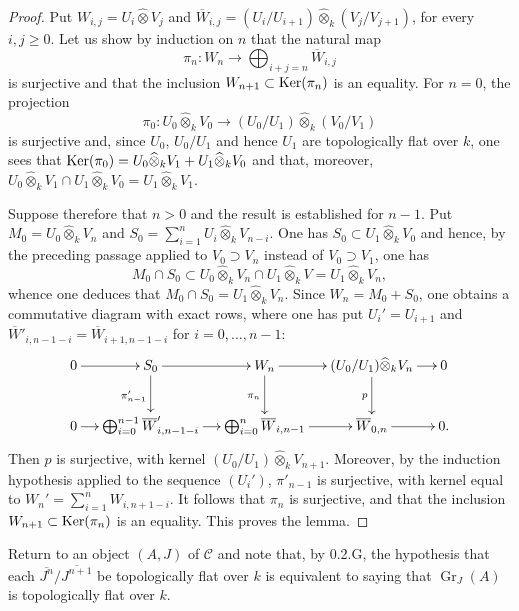 \begin{proof}
Put $W_{i,j}=U_i\widehat\otimes V_j$ and $\overline W_{i,j}=(U_i/U_{i+1})\widehat\otimes_k(V_j/V_{j+1})$, for every $i,j\ge0$. Let us show by induction on $n$ that the natural map
\[
\pi_n:W_n\longrightarrow\bigoplus_{i+j=n}\overline W_{i,j}
\]
is surjective and that the inclusion $W_{n+1}\subset\operatorname{Ker}(\pi_n)$ is an equality. For $n=0$, the projection
\[
\pi_0:U_0\widehat\otimes_k V_0\longrightarrow(U_0/U_1)\widehat\otimes_k(V_0/V_1)
\]
is surjective and, since $U_0$, $U_0/U_1$ and hence $U_1$ are topologically flat over $k$, one sees that $\operatorname{Ker}(\pi_0)=U_0\widehat\otimes_k V_1+U_1\widehat\otimes_k V_0$ and that, moreover, $U_0\widehat\otimes_k V_1\cap U_1\widehat\otimes_k V_0=U_1\widehat\otimes_k V_1$.

Suppose therefore that $n>0$ and the result is established for $n-1$. Put $M_0=U_0\widehat\otimes_k V_n$ and $S_0=\sum_{i=1}^n U_i\widehat\otimes_k V_{n-i}$. One has $S_0\subset U_1\widehat\otimes_k V_0$ and hence, by the preceding passage applied to $V_0\supset V_n$ instead of $V_0\supset V_1$, one has
\[
M_0\cap S_0\subset U_0\widehat\otimes_k V_n\cap U_1\widehat\otimes_k V=U_1\widehat\otimes_k V_n,
\]
whence one deduces that $M_0\cap S_0=U_1\widehat\otimes_k V_n$. Since $W_n=M_0+S_0$, one obtains a commutative diagram with exact rows, where one has put $U_i'=U_{i+1}$ and $\overline W'_{i,n-1-i}=\overline W_{i+1,n-1-i}$ for $i=0,\ldots,n-1$:
\[
\xymatrix@C=12pt@R=25pt{
0\ar[r]&S_0\ar[r]\ar[d]_{\pi'_{n-1}}&W_n\ar[r]\ar[d]_{\pi_n}&(U_0/U_1)\widehat\otimes_k V_n\ar[r]\ar[d]_p&0\\
0\ar[r]&\bigoplus_{i=0}^{n-1}\overline W'_{i,n-1-i}\ar[r]&\bigoplus_{i=0}^n\overline W_{i,n-1}\ar[r]&\overline W_{0,n}\ar[r]&0.}
\]
Then $p$ is surjective, with kernel $(U_0/U_1)\widehat\otimes_k V_{n+1}$. Moreover, by the induction hypothesis applied to the sequence $(U_i')$, $\pi'_{n-1}$ is surjective, with kernel equal to $W_n'=\sum_{i=1}^n W_{i,n+1-i}$. It follows that $\pi_n$ is surjective, and that the inclusion $W_{n+1}\subset\operatorname{Ker}(\pi_n)$ is an equality. This proves the lemma.
\end{proof}
Return to an object $(A,J)$ of $\mathscr C$ and note that, by 0.2.G, the hypothesis that each $\overline{J^n}/\overline{J^{n+1}}$ be topologically flat over $k$ is equivalent to saying that $\operatorname{Gr}_J(A)$ is topologically flat over $k$.

